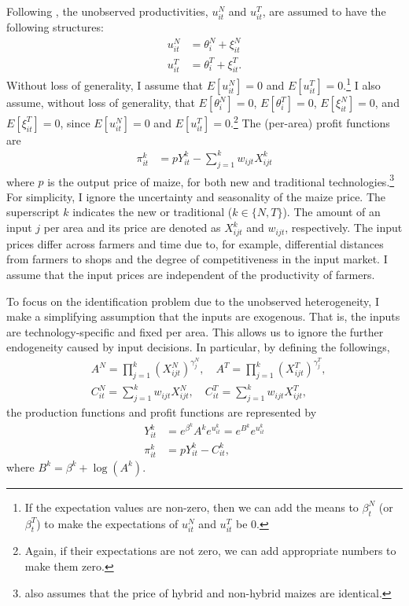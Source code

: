 \documentclass[11pt,letterpaper]{article}
\begin{document}
Following \cite{Suri11}, the unobserved productivities, $u_{it}^N$ and $u_{it}^T$, are assumed to have the following structures:
\begin{align*}
  u_{it}^N &= \theta_i^N + \xi_{it}^N \\
  u_{it}^T &= \theta_i^T + \xi_{it}^T.
\end{align*}
Without loss of generality, I assume that $E[u_{it}^N] = 0$ and $E[u_{it}^T] = 0$.\footnote{
  If the expectation values are non-zero, then we can add the means to $\beta_t^N$ (or $\beta_t^T$) to make the expectations of $u_{it}^N$ and $u_{it}^T$ be 0.
}
I also assume, without loss of generality, that $E[\theta_i^N] = 0$, $E[\theta_i^T] = 0$, $E[\xi_{it}^N] = 0$, and $E[\xi_{it}^T] = 0$, since $E[u_{it}^N] = 0$ and $E[u_{it}^T] = 0$.\footnote{
  Again, if their expectations are not zero, we can add appropriate numbers to make them zero.
}
The (per-area) profit functions are
\begin{align*}
  \pi_{it}^k &= p Y_{it}^k - \sum_{j=1}^k w_{ijt} X_{ijt}^k
\end{align*}
where $p$ is the output price of maize, for both new and traditional technologies.\footnote{
  \citet{Suri11} also assumes that the price of hybrid and non-hybrid maizes are identical.
}
For simplicity, I ignore the uncertainty and seasonality of the maize price.
The superscript $k$ indicates the new or traditional ($k \in \{N, T\}$).
The amount of an input $j$ per area and its price are denoted as $X_{ijt}^k$ and $w_{ijt}$, respectively.
The input prices differ across farmers and time due to, for example, differential distances from farmers to shops and the degree of competitiveness in the input market.
I assume that the input prices are independent of the productivity of farmers. 

To focus on the identification problem due to the unobserved heterogeneity, I make a simplifying assumption that the inputs are exogenous.
That is, the inputs are technology-specific and fixed per area.
This allows us to ignore the further endogeneity caused by input decisions.
In particular, by defining the followings,
\begin{align*}
  &A^N = \prod_{j = 1}^k \left( X_{ijt}^N \right)^{\gamma_j^N}, \quad A^T = \prod_{j = 1}^k \left( X_{ijt}^T \right)^{\gamma_j^T}, \\
  &C_{it}^N = \sum_{j = 1}^k w_{ijt} X_{ijt}^N, \quad C_{it}^T = \sum_{j = 1}^k w_{ijt} X_{ijt}^T,
\end{align*}
the production functions and profit functions are represented by
\begin{align*}
  Y_{it}^k &= e^{\beta^k} A^k e^{u_{it}^k} = e^{B^k} e^{u_{it}^k} \\
  \pi_{it}^k &= p Y_{it}^k - C_{it}^k,
\end{align*}
where $B^k = \beta^k + \log(A^k)$.
\end{document}
